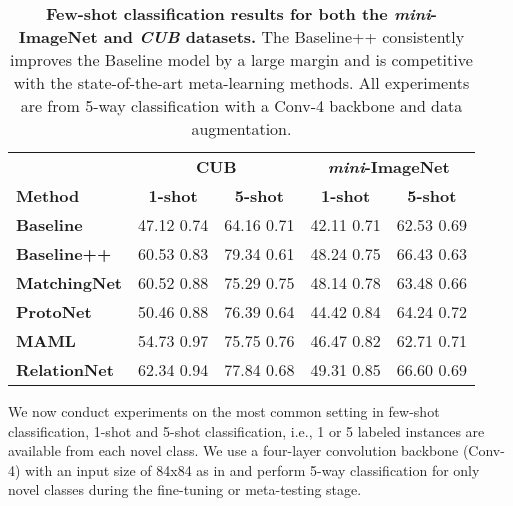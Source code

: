 \documentclass{article}
\def \miniI {\emph{mini}-ImageNet }
\begin{document}
\begin{table}[t]
\centering
\caption{\textbf{Few-shot classification results for both the \miniI and \textit{CUB} datasets.} The  Baseline++ consistently improves the Baseline model by a large margin and is competitive with the state-of-the-art meta-learning methods. All experiments are from 5-way classification with a Conv-4 backbone and data augmentation. }
\label{tab:CUB_miniI}
\begin{tabular}{lcccc}
\toprule
\textbf{}             & \multicolumn{2}{c}{\textbf{CUB}}        & \multicolumn{2}{c}{\textbf{\miniI}}                \\
\small{\textbf{Method}}             & \textbf{1-shot}    & \textbf{5-shot}    & \textbf{1-shot}    & \textbf{5-shot}    \\ \midrule
\small{\textbf{Baseline}}                                 & \small{47.12  0.74}     & \small{64.16  0.71}      & \small{42.11  0.71}      & \small{62.53 0.69}    \\
\small{\textbf{Baseline++}}                               & \small{60.53  0.83}     & \small{79.34  0.61} & \small{48.24  0.75}      & \small{66.43 0.63}   \\ \midrule
\small{\textbf{MatchingNet}} \cite{vinyals2016matching}   & \small{60.52  0.88}     & \small{75.29  0.75}      & \small{48.14  0.78}      & \small{63.48 0.66}    \\
\small{\textbf{ProtoNet}} \cite{snell2017prototypical}    & \small{50.46  0.88}     & \small{76.39  0.64}      & \small{44.42  0.84}      & \small{64.24 0.72}    \\
\small{\textbf{MAML}}  \cite{finn2017model}               & \small{54.73  0.97}     & \small{75.75  0.76}      & \small{46.47  0.82}      & \small{62.71 0.71}    \\
\small{\textbf{RelationNet}} \cite{sung2018learning}      & \small{62.34  0.94}     & \small{77.84  0.68}      & \small{49.31  0.85} & \small{66.60 0.69}    \\ \bottomrule
\end{tabular}
\end{table}
 
We now conduct experiments on the most common setting in few-shot classification, 1-shot and 5-shot classification, i.e., 1 or 5 labeled instances are available from each novel class. We use a four-layer convolution backbone (Conv-4) with an input size of 84x84 as in \cite{snell2017prototypical} and perform 5-way classification for only novel classes during the fine-tuning or meta-testing stage.
\end{document}
